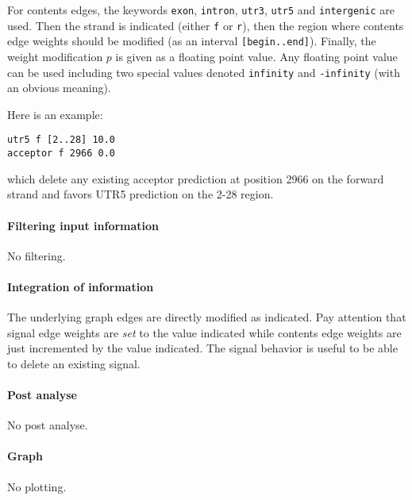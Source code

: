 For contents edges, the keywords \texttt{exon}, \texttt{intron},
\texttt{utr3}, \texttt{utr5} and \texttt{intergenic} are used. Then
the strand is indicated (either \texttt{f} or \texttt{r}), then the
region where contents edge weights should be modified (as an interval
\texttt{[begin..end]}). Finally, the weight modification $p$ is given
as a floating point value. Any floating point value can be used
including two special values denoted \texttt{infinity} and
\texttt{-infinity} (with an obvious meaning).

Here is an example:
\begin{Verbatim}[fontsize=\small]
utr5 f [2..28] 10.0
acceptor f 2966 0.0
\end{Verbatim}

which delete any existing acceptor prediction at position 2966 on the
forward strand and favors UTR5 prediction on the 2-28 region.

\paragraph{Filtering input information}

No filtering.

\paragraph{Integration of information}

The underlying graph edges are directly modified as indicated. Pay
attention that signal edge weights are \emph{set} to the value
indicated while contents edge weights are just incremented by the
value indicated. The signal behavior is useful to be able to delete an
existing signal.

\paragraph{Post analyse}

No post analyse.

\paragraph{Graph}

No plotting.





